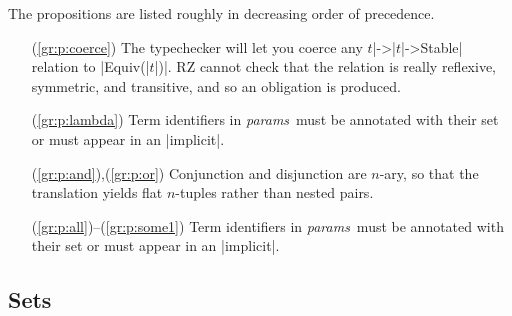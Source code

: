 \documentclass[11pt]{article}
\newcommand{\metav}[1]{\mbox{\textit{#1}}}
\newcommand{\Params}{\metav{params}}
\begin{document}
The propositions are listed roughly in decreasing order of precedence.

\begin{enumerate}
	\item[(\ref{gr:p:coerce})] The typechecker will let you coerce any  $t$|->|$t$|->Stable| relation to |Equiv(|$t$|)|.  RZ cannot check that the relation is really reflexive, symmetric, and transitive, and so an obligation is produced.
	\item[(\ref{gr:p:lambda})] Term identifiers in \Params\ must be annotated with their set or must appear in an |implicit|.
	\item[(\ref{gr:p:and}),(\ref{gr:p:or})] Conjunction and disjunction are $n$-ary, so that the translation yields flat $n$-tuples rather than nested pairs.
	\item[(\ref{gr:p:all})--(\ref{gr:p:some1})] Term identifiers in \Params\ must be annotated with their set or must appear in an |implicit|.
\end{enumerate}

\iffalse
& \mid & $\metav{longrelation}\ [\ \Term\ ]^*$\\
   $\metav{longunaryrelation}\ \Term$\\
   $\Term\ \metav{longbinaryrelation}\ \Term$\\	 
\fi

\subsection{Sets}
\end{document}
